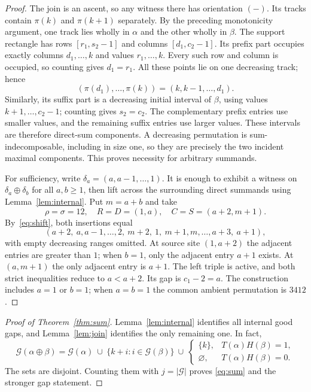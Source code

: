 \documentclass[11pt,a4paper]{article}
\theoremstyle{remark}
\newcommand{\good}{\mathcal{G}}\newcommand{\skewsum}{\mathbin{\mathrm{skew}}}
\begin{document}
\begin{proof}
The join is an ascent, so any witness there has orientation $(-)$.
Its tracks contain $\pi(k)$ and $\pi(k+1)$ separately. By the preceding
monotonicity argument, one track lies wholly in $\alpha$ and the other
wholly in $\beta$. The support rectangle has rows $[r_1,s_2-1]$ and
columns $[d_1,c_2-1]$. Its prefix part occupies exactly columns
$d_1,\ldots,k$ and values $r_1,\ldots,k$. Every such row and column
is occupied, so counting gives $d_1=r_1$. All these points lie on one
decreasing track; hence
\[
 (\pi(d_1),\ldots,\pi(k))=(k,k-1,\ldots,d_1).
\]
Similarly, its suffix part is a decreasing initial interval of $\beta$,
using values $k+1,\ldots,c_2-1$; counting gives $s_2=c_2$.
The complementary prefix entries use smaller values, and the remaining
suffix entries use larger values. These intervals are therefore
direct-sum components. A decreasing permutation is sum-indecomposable,
including in size one, so they are precisely the two incident maximal
components. This proves necessity for arbitrary summands.

For sufficiency, write $\delta_a=(a,a-1,\ldots,1)$.
It is enough to exhibit a witness on $\delta_a\oplus\delta_b$ for
all $a,b\ge1$, then lift across the surrounding direct summands using
Lemma~\ref{lem:internal}. Put $m=a+b$ and take
\begin{equation}\label{eq:witness}
 \rho=\sigma=12,\quad R=D=(1,a),\quad C=S=(a+2,m+1).
\end{equation}
By~\eqref{eq:shift}, both insertions equal
\begin{equation}\label{eq:ambient}
 (a+2,\ a,a-1,\ldots,2,\ m+2,\ 1,\ m+1,m,\ldots,a+3,\ a+1),
\end{equation}
with empty decreasing ranges omitted. At source site $(1,a+2)$
the adjacent entries are greater than $1$; when $b=1$, only the
adjacent entry $a+1$ exists. At $(a,m+1)$ the only adjacent entry is
$a+1$. The left triple is active, and both strict inequalities reduce
to $a<a+2$. Its gap is $c_1-2=a$. The construction includes $a=1$
or $b=1$; when $a=b=1$ the common ambient permutation is $3412$.
\end{proof}

\begin{proof}[Proof of Theorem~\ref{thm:sum}]
Lemma~\ref{lem:internal} identifies all internal good gaps, and
Lemma~\ref{lem:join} identifies the only remaining one. In fact,
\[
 \good(\alpha\oplus\beta)=\good(\alpha)\ \cup\
 \{k+i:i\in\good(\beta)\}\ \cup\
 \begin{cases}\{k\},&T(\alpha)H(\beta)=1,\\
 \varnothing,&T(\alpha)H(\beta)=0.
 \end{cases}
\]
The sets are disjoint. Counting them with $j=|\good|$ proves
\eqref{eq:sum} and the stronger gap statement.
\end{proof}
\end{document}
